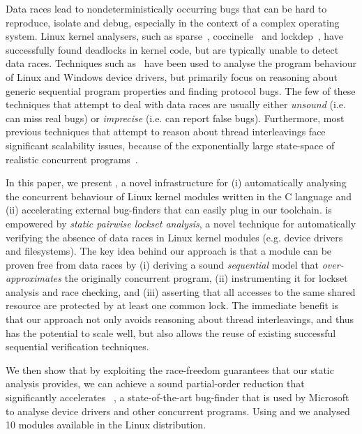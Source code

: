 Data races lead to nondeterministically occurring bugs that can be hard to reproduce, isolate and debug, especially in the context of a complex operating system.  Linux kernel analysers, such as sparse~\cite{corbet2004sparse}, coccinelle~\cite{padioleau2008doc} and lockdep~\cite{corbet2006lock}, have successfully found deadlocks in kernel code, but are typically unable to detect data races. Techniques such as~\cite{ball2006thorough, clarke2004predicate, qadeer2004kiss, engler2000checking, henzinger2002temporal, cook2006termination, pratikakis2006locksmith, kuznetsov2010testing, renzelmann2012symdrive, lal2012corral} have been used to analyse the program behaviour of Linux and Windows device drivers, but primarily focus on reasoning about generic sequential program properties and finding protocol bugs. The few of these techniques that attempt to deal with data races are usually either \emph{unsound} (i.e. can miss real bugs) or \emph{imprecise} (i.e. can report false bugs). Furthermore, most previous techniques that attempt to reason about thread interleavings face significant scalability issues, because of the exponentially large state-space of realistic concurrent programs~\cite{musuvathi2008finding}.

In this paper, we present \whoop, a novel infrastructure for (i) automatically analysing the concurrent behaviour of Linux kernel modules written in the C language and (ii) accelerating external bug-finders that can easily plug in our toolchain. \whoop is empowered by \emph{static pairwise lockset analysis}, a novel technique for automatically verifying the absence of data races in Linux kernel modules (e.g. device drivers and filesystems). The key idea behind our approach is that a module can be proven free from data races by (i) deriving a sound \emph{sequential} model that \emph{over-approximates} the originally concurrent program, (ii) instrumenting it for lockset analysis and race checking, and (iii) asserting that all accesses to the same shared resource are protected by at least one common lock. The immediate benefit is that our approach not only avoids reasoning about thread interleavings, and thus has the potential to scale well, but also allows the reuse of existing successful sequential verification techniques.

We then show that by exploiting the race-freedom guarantees that our static analysis provides, we can achieve a sound partial-order reduction that significantly accelerates \corral~\cite{lal2012solver}, a state-of-the-art bug-finder that is used by Microsoft to analyse device drivers and other concurrent programs. Using \whoop and \corral we analysed 10 modules available in the Linux distribution.

